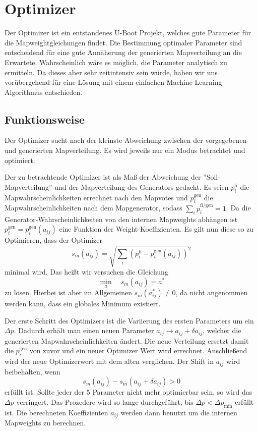 \section{Optimizer}
Der Optimizer ist ein entstandenes U-Boot Projekt, welches gute Parameter für  die Mapweightgleichungen  findet.
Die Bestimmung optimaler Parameter sind entscheidend für eine gute Annäherung der generierten Mapverteilung an die Erwartete.
Wahrscheinlich wäre es möglich, die Parameter analytisch zu ermitteln. Da dieses aber sehr zeitintensiv sein würde, 
haben wir uns vorübergehend für eine Lösung mit einem einfachen \glqq{}Machine Learning\grqq{} Algorithmus entschieden. 
\subsection{Funktionsweise}
Der Optimizer sucht nach der kleinste Abweichung zwischen der vorgegebenen und generierten Mapverteilung. 
Es wird jeweils nur ein Modus betrachtet und optimiert.

Der zu betrachtende Optimizer ist als Maß der Abweichung der ''Soll-Mapverteilung'' und der Mapverteilung des Generators gedacht. 
Es seien $p_i^\text{fi}$ die Mapwahrscheinlichkeiten errechnet nach den Mapvotes und $p_i^\text{gen}$ die Mapwahrscheinlichkeiten nach dem Mapgenerator, sodass $\sum_i p_i^\text{fi/gen}=1$.
Da die Generator-Wahrscheinlichkeiten von den internen Mapweights abhängen ist $p_i^\text{gen}=p_i^\text{gen}(a_{ij})$ eine Funktion der Weight-Koeffizienten. 
Es gilt nun diese so zu Optimieren, dass der Optimizer 
\begin{equation}
    s_m(a_{ij}) = \sqrt{\sum_i \left(p_i^\text{fi}-p_i^\text{gen}(a_{ij})\right)^2}
\end{equation}
minimal wird. 
Das heißt wir versuchen die Gleichung 
\begin{equation}
    \underset{a}{\min}\quad s_m(a_{ij}) = a^*
\end{equation}
zu lösen. 
Hierbei ist aber im Allgemeinen $s_m(a^*_{ij}) \neq 0$, da nicht angenommen werden kann, dass ein globales Minimum existiert. 

Der erste Schritt des Optimizers ist die Variierung des ersten Parameters um ein $\varDelta p$.
Dadurch erhält man einen neuen Parameter $a_{ij} \rightarrow a_{ij} + \delta a_{ij}$, welcher die generierten Mapwahrscheinlichkeiten ändert.
Die neue Verteilung ersetzt damit die $p_i^\text{gen}$ von zuvor und ein neuer Optimizer Wert wird errechnet. 
Anschließend wird der neue Optimizerwert mit dem alten verglichen. 
Der Shift in $a_{ij}$ wird beibehalten, wenn 
\begin{equation}
    s_m(a_{ij}) - s_m(a_{ij}+\delta a_{ij}) > 0 
\end{equation}
erfüllt ist. 
Sollte jeder der 5 Parameter nicht mehr optimierbar sein, so wird das $\varDelta p$ verringert.
Das Prozedere wird so lange durchgeführt, bis $\varDelta p < \varDelta p_\text{min}$ erfüllt ist. 
Die berechneten Koeffizienten $a_{ij}$ werden dann benutzt um die internen Mapweights zu berechnen.
